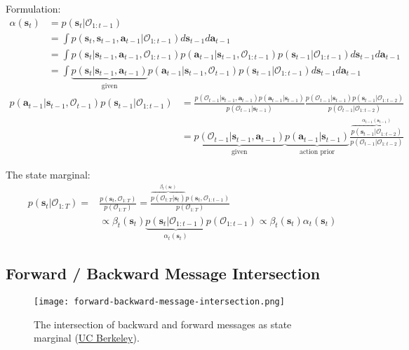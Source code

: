 Formulation:
\begin{align}
	\alpha(\textbf{s}_t) &= p(\textbf{s}_t | \mathcal{O}_{1:t-1})\\
	&= \int p(\textbf{s}_t, \textbf{s}_{t-1}, \textbf{a}_{t-1} | \mathcal{O}_{1:t-1}) d\textbf{s}_{t-1} d\textbf{a}_{t-1}\\
	&= \int p(\textbf{s}_t | \textbf{s}_{t-1}, \textbf{a}_{t-1}, \mathcal{O}_{1:t-1}) p(\textbf{a}_{t-1} |\textbf{s}_{t-1}, \mathcal{O}_{1:t-1}) p(\textbf{s}_{t-1} | \mathcal{O}_{1:t-1}) d\textbf{s}_{t-1} d\textbf{a}_{t-1} \\
	&= \int \underbrace{p(\textbf{s}_t | \textbf{s}_{t-1}, \textbf{a}_{t-1})}_{\text{given}} p(\textbf{a}_{t-1} |\textbf{s}_{t-1}, \mathcal{O}_{t-1}) p(\textbf{s}_{t-1} | \mathcal{O}_{1:t-1}) d\textbf{s}_{t-1} d\textbf{a}_{t-1}
\end{align}
\begin{align}
	p(\textbf{a}_{t-1} |\textbf{s}_{t-1}, \mathcal{O}_{t-1}) p(\textbf{s}_{t-1} | \mathcal{O}_{1:t-1}) &= \frac{p(\mathcal{O}_{t-1} | \textbf{s}_{t-1}, \textbf{a}_{t-1}) p(\textbf{a}_{t-1} | \textbf{s}_{t-1})}{p(\mathcal{O}_{t-1} | \textbf{s}_{t-1})} \frac{p(\mathcal{O}_{t-1} | \textbf{s}_{t-1}) p(\textbf{s}_{t-1} | \mathcal{O}_{1:t-2})}{p(\mathcal{O}_{t-1} | \mathcal{O}_{1:t-2})}\\
	&= \underbrace{p(\mathcal{O}_{t-1} | \textbf{s}_{t-1}, \textbf{a}_{t-1})}_{\text{given}} \underbrace{p(\textbf{a}_{t-1} | \textbf{s}_{t-1})}_{\text{action prior}} \frac{\overbrace{p(\textbf{s}_{t-1} | \mathcal{O}_{1:t-2})}^{\textstyle \alpha_{t-1}(\textbf{s}_{t-1})}}{p(\mathcal{O}_{t-1} | \mathcal{O}_{1:t-2})}
\end{align}

The state marginal:
\begin{align}
	p(\textbf{s}_t | \mathcal{O}_{1:T}) =& \frac{p(\textbf{s}_t, \mathcal{O}_{1:T}) }{p(\mathcal{O}_{1:T})} = \frac{\overbrace{p(\mathcal{O}_{t:T} | \textbf{s}_t)}^ {\textstyle \beta_t(\textbf{s}_t)} p(\textbf{s}_t, \mathcal{O}_{1:t-1} )} {p(\mathcal{O}_{1:T})}\\
	& \propto \beta_t(\textbf{s}_t)	\underbrace{p(\textbf{s}_t | \mathcal{O}_{1:t-1})}_{\textstyle \alpha_t(\textbf{s}_t)} p(\mathcal{O}_{1:t-1}) \propto \beta_t(\textbf{s}_t) \alpha_t(\textbf{s}_t)
\end{align}

\subsection{Forward / Backward Message Intersection}
\begin{figure}[hbt!]
	\centering
	\texttt{[image: forward-backward-message-intersection.png]}
	\caption{The intersection of backward and forward messages as state marginal (\href{http://rail.eecs.berkeley.edu/deeprlcourse/static/slides/lec-19.pdf}{UC Berkeley}).}
\end{figure}


